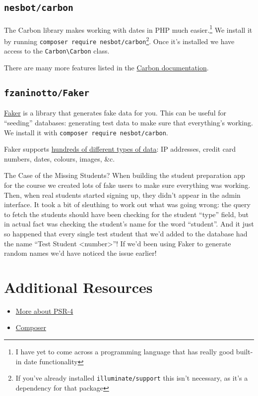 


\subsection{\texttt{nesbot/carbon}}

The Carbon library makes working with dates in PHP much easier.\footnote{I have yet to come across a programming language that has really good built-in date functionality} We install it by running \texttt{composer require nesbot/carbon}\footnote{If you've already installed \texttt{illuminate/support} this isn't necessary, as it's a dependency for that package}. Once it's installed we have access to the \texttt{Carbon\textbackslash Carbon} class.


There are many more features listed in the \href{https://carbon.nesbot.com/docs/}{Carbon documentation}.


\subsection{\texttt{fzaninotto/Faker}}

\href{https://github.com/fzaninotto/Faker}{Faker} is a library that generates fake data for you. This can be useful for ``seeding'' databases: generating test data to make sure that everything's working. We install it with \texttt{composer require nesbot/carbon}.


Faker supports \href{https://github.com/fzaninotto/Faker#formatters}{hundreds of different types of data}: IP addresses, credit card numbers, dates, colours, images, \&c.


\begin{infobox}{The Case of the Missing Students?}
    When building the student preparation app for the course we created lots of fake users to make sure everything was working. Then, when real students started signing up, they didn't appear in the admin interface. It took a bit of sleuthing to work out what was going wrong: the query to fetch the students should have been checking for the student ``type'' field, but in actual fact was checking the student's name for the word ``student''. And it just so happened that every single test student that we'd added to the database had the name ``Test Student <number>''! If we'd been using Faker to generate random names we'd have noticed the issue earlier!
\end{infobox}

\section{Additional Resources}

\begin{itemize}[leftmargin=*]
    \item \href{https://www.php-fig.org/psr/psr-4/meta/}{More about PSR-4}
    \item \href{https://getcomposer.org}{Composer}
\end{itemize}
